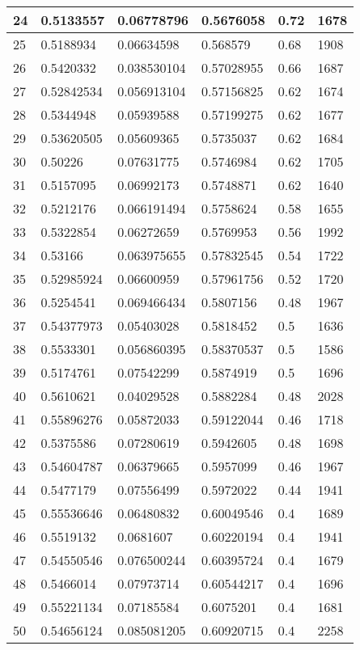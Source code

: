 \begin{longtable}{|l|l|l|l|l|l|}
24 & 0.5133557 & 0.06778796 & 0.5676058 & 0.72 & 1678 \\ \hline 
25 & 0.5188934 & 0.06634598 & 0.568579 & 0.68 & 1908 \\ \hline 
26 & 0.5420332 & 0.038530104 & 0.57028955 & 0.66 & 1687 \\ \hline 
27 & 0.52842534 & 0.056913104 & 0.57156825 & 0.62 & 1674 \\ \hline 
28 & 0.5344948 & 0.05939588 & 0.57199275 & 0.62 & 1677 \\ \hline 
29 & 0.53620505 & 0.05609365 & 0.5735037 & 0.62 & 1684 \\ \hline 
30 & 0.50226 & 0.07631775 & 0.5746984 & 0.62 & 1705 \\ \hline 
31 & 0.5157095 & 0.06992173 & 0.5748871 & 0.62 & 1640 \\ \hline 
32 & 0.5212176 & 0.066191494 & 0.5758624 & 0.58 & 1655 \\ \hline 
33 & 0.5322854 & 0.06272659 & 0.5769953 & 0.56 & 1992 \\ \hline 
34 & 0.53166 & 0.063975655 & 0.57832545 & 0.54 & 1722 \\ \hline 
35 & 0.52985924 & 0.06600959 & 0.57961756 & 0.52 & 1720 \\ \hline 
36 & 0.5254541 & 0.069466434 & 0.5807156 & 0.48 & 1967 \\ \hline 
37 & 0.54377973 & 0.05403028 & 0.5818452 & 0.5 & 1636 \\ \hline 
38 & 0.5533301 & 0.056860395 & 0.58370537 & 0.5 & 1586 \\ \hline 
39 & 0.5174761 & 0.07542299 & 0.5874919 & 0.5 & 1696 \\ \hline 
40 & 0.5610621 & 0.04029528 & 0.5882284 & 0.48 & 2028 \\ \hline 
41 & 0.55896276 & 0.05872033 & 0.59122044 & 0.46 & 1718 \\ \hline 
42 & 0.5375586 & 0.07280619 & 0.5942605 & 0.48 & 1698 \\ \hline 
43 & 0.54604787 & 0.06379665 & 0.5957099 & 0.46 & 1967 \\ \hline 
44 & 0.5477179 & 0.07556499 & 0.5972022 & 0.44 & 1941 \\ \hline 
45 & 0.55536646 & 0.06480832 & 0.60049546 & 0.4 & 1689 \\ \hline 
46 & 0.5519132 & 0.0681607 & 0.60220194 & 0.4 & 1941 \\ \hline 
47 & 0.54550546 & 0.076500244 & 0.60395724 & 0.4 & 1679 \\ \hline 
48 & 0.5466014 & 0.07973714 & 0.60544217 & 0.4 & 1696 \\ \hline 
49 & 0.55221134 & 0.07185584 & 0.6075201 & 0.4 & 1681 \\ \hline 
50 & 0.54656124 & 0.085081205 & 0.60920715 & 0.4 & 2258 \\ \hline 
\end{longtable}